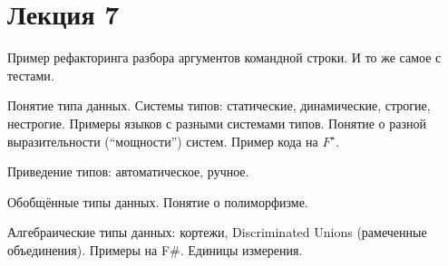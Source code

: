 \section{Лекция 7}

Пример рефакторинга разбора аргументов командной строки. И то же самое с тестами.

 
Понятие типа данных. Системы типов: статические, динамические, строгие, нестрогие. Примеры языков с разными системами типов. Понятие о разной выразительности (``мощности'') систем.
Пример кода на \href{http://www.fstar-lang.org/tutorial/}{$F^\star$}.

Приведение типов: автоматическое, ручное. %

Обобщённые типы данных. Понятие о полиморфизме.
    
Алгебраические типы данных: кортежи, Discriminated Unions (рамеченные объединения). Примеры на F\#. Единицы измерения.
